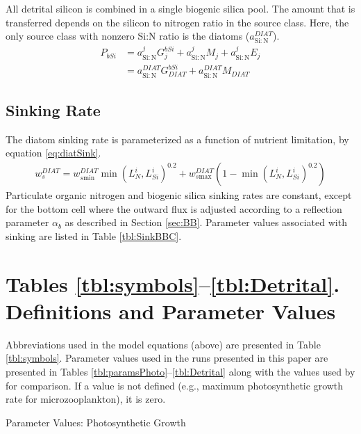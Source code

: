 \documentclass[draft,jgrga]{agutexSI2019}
\begin{document}
\begin{article}
All detrital silicon is combined in a single biogenic silica pool. The amount that is transferred depends on the silicon to nitrogen ratio in the source class. Here, the only source class with nonzero Si:N ratio is the diatoms ($a_{\mathrm{Si:N}}^{DIAT}$). 
\begin{align}
   P_{bSi} & = a_{\mathrm{Si:N}}^j G_j^{bSi}+a_{\mathrm{Si:N}}^j M_j+a_{\mathrm{Si:N}}^j E_j \\
              & = a_{\mathrm{Si:N}}^{DIAT} G_{DIAT}^{bSi}+a_{\mathrm{Si:N}}^{DIAT} M_{DIAT}
\end{align}

\subsection*{Sinking Rate}
The diatom sinking rate is parameterized as a function of nutrient limitation, by equation \ref{eq:diatSink}.
\begin{align}
\label{eq:diatSink}
   w_s^{DIAT} =  w_{s\mathrm{min}}^{DIAT} \min(L_N^i, L_{Si}^i)^{0.2} + w_{s\mathrm{max}}^{DIAT} (1 -  \min(L_N^i, L_{Si}^i)^{0.2})
\end{align}
Particulate organic nitrogen and biogenic silica sinking rates are constant, except for the bottom cell where the outward flux is adjusted according to a reflection parameter $\alpha_b$ as described in Section \ref{sec:BB}.
Parameter values associated with sinking are listed in Table \ref{tbl:SinkBBC}.


\section*{Tables \ref{tbl:symbols}--\ref{tbl:Detrital}. Definitions and Parameter Values}
Abbreviations used in the model equations (above) are presented in Table \ref{tbl:symbols}. Parameter values used in the runs presented in this paper are presented in Tables \ref{tbl:paramsPhoto}--\ref{tbl:Detrital} along with the values used by  for comparison. If a value is not defined (e.g., maximum photosynthetic growth rate for microzooplankton), it is zero. 

\begin{table}[!ht]
  \caption{Parameter Values: Photosynthetic Growth} %
  \label{tbl:paramsPhoto}
  \begin{spacing}{0.4}
   
  \end{spacing}
\end{table}


\end{article}
\end{document}
